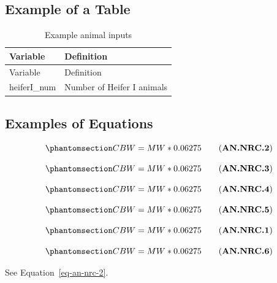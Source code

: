 \documentclass[
  letterpaper,
  oneside,
  openany]{scrbook}
\begin{document}
\subsection{Example of a Table}\label{example-of-a-table-1}

\begin{longtable}[]{@{}ll@{}}
\caption{Example animal inputs}\label{tbl-animal-inputs}\tabularnewline
\toprule\noalign{}
Variable & Definition \\
\midrule\noalign{}
\endfirsthead
\toprule\noalign{}
Variable & Definition \\
\midrule\noalign{}
\endhead
\bottomrule\noalign{}
\endlastfoot
heiferI\_num & Number of Heifer I animals \\
\end{longtable}

\subsection{Examples of Equations}\label{examples-of-equations-1}

\begin{equation}\protect\phantomsection\label{eq-an-nrc-2}{
CBW = MW * 0.06275 \tag{\textbf{AN.NRC.2}}
}\end{equation}

\begin{equation}\protect\phantomsection\label{eq-an-nrc-3}{
CBW = MW * 0.06275 \tag{\textbf{AN.NRC.3}}
}\end{equation}

\begin{equation}\protect\phantomsection\label{eq-an-nrc-4}{
CBW = MW * 0.06275 \tag{\textbf{AN.NRC.4}}
}\end{equation}

\begin{equation}\protect\phantomsection\label{eq-an-nrc-5}{
CBW = MW * 0.06275 \tag{\textbf{AN.NRC.5}}
}\end{equation}

\begin{equation}\protect\phantomsection\label{eq-an-nrc-1}{
CBW = MW * 0.06275 \tag{\textbf{AN.NRC.1}}
}\end{equation}

\begin{equation}\protect\phantomsection\label{eq-an-nrc-6}{
CBW = MW * 0.06275 \tag{\textbf{AN.NRC.6}}
}\end{equation}

See Equation~\ref{eq-an-nrc-2}.
\end{document}
